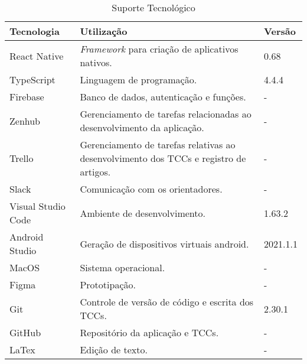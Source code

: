 \begin{table}[htbp]
	\centering
    \caption{Suporte Tecnológico}
	\label{tab06}
	\begin{tabular}{p{4cm}p{7cm}p{2cm}}
	\toprule
	\textbf{Tecnologia} & \textbf{Utilização}  & \textbf{Versão}   \\  
	\midrule
	 React Native                     	& \emph{Framework} para criação de aplicativos nativos. 	 &  0.68   \\  
\midrule	TypeScript & Linguagem de programação.     &  4.4.4 \\  
\midrule	Firebase                         &  Banco de dados, autenticação e funções.                    &  -  \\  
\midrule	 Zenhub  &  Gerenciamento de tarefas relacionadas ao desenvolvimento da aplicação.   &  -  \\  
\midrule	Trello   	& Gerenciamento de tarefas relativas ao desenvolvimento dos TCCs e registro de artigos. 	 &  -  \\  
\midrule	 Slack    &  Comunicação com os orientadores.        &  -  \\  
\midrule	 Visual Studio Code  	& Ambiente de desenvolvimento. 	 &  1.63.2  \\ 
\midrule	 Android Studio  &  Geração de dispositivos virtuais android.  &   2021.1.1  \\ 
\midrule	 MacOS                &  Sistema operacional.                        &  -                               \\ 
\midrule	 Figma  &  Prototipação.  &   -  \\ 
\midrule	Git 	& Controle de versão de código e escrita dos TCCs. 	 &  2.30.1   \\ 
\midrule	 GitHub &  Repositório da aplicação e TCCs.    &  -  \\ 
\midrule	 LaTex   &  Edição de texto.   &  -   \\ 
	\bottomrule
\end{tabular}
\end{table}
